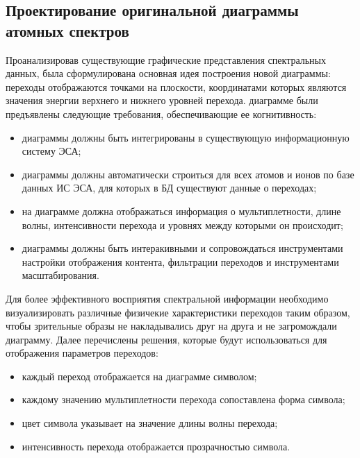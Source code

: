 \documentclass[a4paper, 12pt]{article}
\begin{document}
    \subsection{Проектирование оригинальной диаграммы атомных спектров}
    Проанализировав существующие графические представления спектральных данных, была сформулирована основная идея построения новой диаграммы: переходы отображаются точками на плоскости, координатами которых являются значения энергии верхнего и нижнего уровней перехода.
     диаграмме были предъявлены следующие требования, обеспечивающие ее когнитивность:
    \begin{itemize}
        \item диаграммы должны быть интегрированы в существующую информационную систему ЭСА;
        \item диаграммы должны автоматически строиться для всех атомов и ионов по базе данных ИС ЭСА, для которых в БД существуют данные о переходах;
        \item на диаграмме должна отображаться информация о мультиплетности, длине волны, интенсивности перехода и уровнях между которыми он происходит;
        \item диаграммы должны быть интеракивными и сопровождаться инструментами настройки отображения контента, фильтрации переходов и инструментами масштабирования.
    \end{itemize}\par
    Для более эффективного восприятия спектральной информации необходимо визуализировать различные физичекие характеристики переходов таким образом, чтобы зрительные образы не накладывались друг на друга и не загромождали диаграмму. Далее перечислены решения, которые будут использоваться для отображения параметров переходов:
    \begin{itemize}
        \item каждый переход отображается на диаграмме символом;
        \item каждому значению мультиплетности перехода сопоставлена форма символа;
        \item цвет символа указывает на значение длины волны перехода;
        \item интенсивность перехода отображается прозрачностью символа.
    \end{itemize}\par
\end{document}

